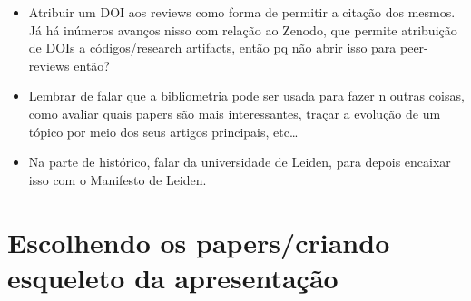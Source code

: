 \documentclass[11pt]{article}
\begin{document}
\begin{itemize}
\item Atribuir um DOI aos reviews como forma de permitir a citação dos mesmos. Já há inúmeros avanços nisso com relação ao Zenodo, que permite atribuição de DOIs a códigos/research artifacts, então pq não abrir isso para peer-reviews então?
\item Lembrar de falar que a bibliometria pode ser usada para fazer n outras coisas, como avaliar quais papers são mais interessantes, traçar a evolução de um tópico por meio dos seus artigos principais, etc\ldots{}
\item Na parte de histórico, falar da universidade de Leiden, para depois encaixar isso com o Manifesto de Leiden.
\end{itemize}

\section{Escolhendo os papers/criando esqueleto da apresentação}
\label{sec:org36010b1}
\end{document}
